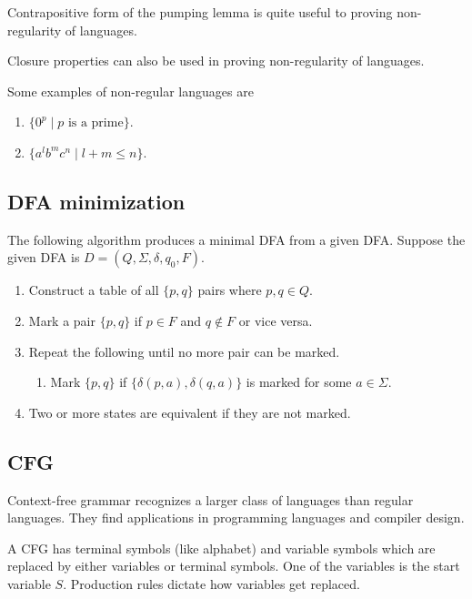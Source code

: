 \documentclass{article}
\begin{document}
Contrapositive form of the pumping lemma is quite useful to proving non-regularity of languages.

Closure properties can also be used in proving non-regularity of languages.

Some examples of non-regular languages are

\begin{enumerate}
\item\label{item:17} $\{ 0^p \mid p \text{ is a prime} \}$. 
\item\label{item:18} $\{ a^lb^mc^n \mid l+m \leq n \}$.
\end{enumerate}

\subsection{DFA minimization}

The following algorithm produces a minimal DFA from a given DFA. Suppose the given DFA is $D = (Q, \Sigma, \delta, q_0, F)$.
\begin{enumerate}
\item\label{item:19} Construct a table of all $\{ p, q \}$ pairs where $p, q \in Q$. 
\item\label{item:20} Mark a pair $\{p, q\}$ if $p \in F$ and $q \not\in F$ or vice versa. 
\item\label{item:21} Repeat the following until no more pair can be marked.
\begin{enumerate}
\item\label{item:22} Mark $\{p, q\}$ if $\{ \delta(p, a), \delta(q, a) \}$ is marked for some $a \in \Sigma$.
\end{enumerate} 
\item\label{item:23} Two or more states are equivalent if they are not marked.
\end{enumerate}

\subsection{CFG}

Context-free grammar recognizes a larger class of languages than regular languages. They find applications in programming languages and compiler design.

A CFG has terminal symbols (like alphabet) and variable symbols which are replaced by either variables or terminal symbols. One of the variables is the start variable $S$. Production rules dictate how variables get replaced.
\end{document}
